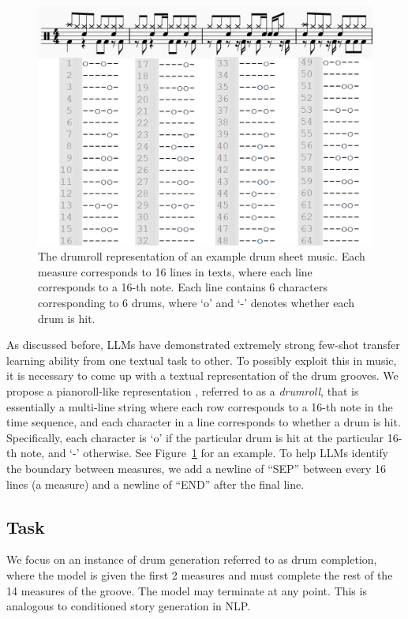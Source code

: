 \documentclass[letterpaper]{article} %
\begin{document}
\begin{figure}[t!]
\centering
\includegraphics[scale=0.46]{images/drumroll.png}
\caption{The drumroll representation of an example drum sheet music. Each measure corresponds to 16 lines in texts, where each line corresponds to a 16-th note. Each line contains 6 characters corresponding to 6 drums, where `o' and `-' denotes whether each drum is hit.}
\label{fig:drumroll}
\end{figure}

As discussed before, LLMs have demonstrated extremely strong few-shot transfer learning ability from one textual task to other. To possibly exploit this in music, it is necessary to come up with a textual representation of the drum grooves. We propose a pianoroll-like representation \cite{brunner2018symbolic}, referred to as a \textit{drumroll}, that is essentially a multi-line string where each row corresponds to a 16-th note in the time sequence, and each character in a line corresponds to whether a drum is hit. Specifically, each character is `o' if the particular drum is hit at the particular 16-th note, and `-' otherwise. See Figure~\ref{fig:drumroll} for an example. To help LLMs identify the boundary between measures, we add a newline of ``SEP'' between every 16 lines (a measure) and a newline of ``END'' after the final line.

\subsection{Task}
We focus on an instance of drum generation referred to as drum completion, where the model is given the first 2 measures and must complete the rest of the 14 measures of the groove. The model may terminate at any point. This is analogous to conditioned story generation in NLP.
\end{document}
